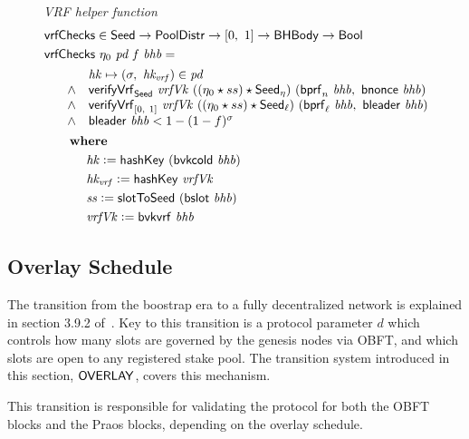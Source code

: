 \begin{figure}
  \emph{VRF helper function}
  \begin{align*}
      & \mathsf{vrfChecks} \in \mathsf{Seed} \to \mathsf{PoolDistr} \to [0,~1] \to \mathsf{BHBody} \to \mathsf{Bool} \\
      & \mathsf{vrfChecks}~\eta_0~\mathit{pd}~\mathit{f}~\mathit{bhb} = \\
      & \begin{array}{cl}
        ~~~~ & \mathit{hk}\mapsto (\sigma,~\mathit{hk_{vrf}})\in\mathit{pd} \\
        ~~~~ \land &
             \mathsf{verifyVrf}_{\mathsf{Seed}} ~ \mathit{vrfVk} ~ ((\eta_0\star ss)\star\mathsf{Seed}_\eta) ~(\mathsf{bprf}_{n}~\mathit{bhb},~\mathsf{bnonce}~\mathit{bhb}) \\
        ~~~~ \land &
             \mathsf{verifyVrf}_{[0,~1]} ~ \mathit{vrfVk} ~ ((\eta_0\star ss)\star\mathsf{Seed}_\ell) ~(\mathsf{bprf}_{\ell}~\mathit{bhb},~\mathsf{bleader}~\mathit{bhb}) \\
        ~~~~ \land &
             \mathsf{bleader}~\mathit{bhb} < 1 - (1 - f)^{\sigma} \\
      \end{array} \\
      & ~~~~~ ~ \mathbf{where}~ ~  \\
      & ~~~~~~~~~~\mathit{hk} \mathrel{\mathop:}= \mathsf{hashKey}~ \mathit{(\mathsf{bvkcold}~\mathit{b}hb)} \\
      & ~~~~~~~~~~\mathit{hk_{vrf}} \mathrel{\mathop:}= \mathsf{hashKey}~ \mathit{vrfVk} \\
      & ~~~~~~~~~~\mathit{ss} \mathrel{\mathop:}= \mathsf{slotToSeed}~ \mathit{(\mathsf{bslot}~\mathit{bhb})} \\
      & ~~~~~~~~~~\mathit{vrfVk} \mathrel{\mathop:}= \mathsf{bvkvrf}~\mathit{bhb} \\
  \end{align*}
  \label{fig:vrf-checks}
\end{figure}

\clearpage

\subsection{Overlay Schedule}
\label{sec:overlay-schedule}

The transition from the boostrap era to a fully decentralized network is explained in
section 3.9.2 of~\cite{delegation_design}.
Key to this transition is a protocol parameter $d$ which controls how many slots are governed by
the genesis nodes via OBFT, and which slots are open to any registered stake pool.
The transition system introduced in this section, $\mathsf{OVERLAY}$, covers this mechanism.

This transition is responsible for validating the protocol for both the OBFT blocks
and the Praos blocks, depending on the overlay schedule.

